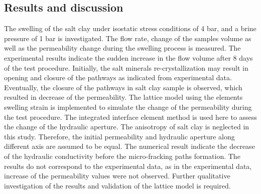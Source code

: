 
\subsection{Results and discussion}

The swelling of the salt clay under isostatic stress conditions of 4 bar, and a brine pressure of 1 bar is investigated. The flow rate, change of the samples volume as well as the permeability change during the swelling process is measured. The experimental results indicate the sudden increase in the flow volume after 8 days of the test procedure. Initially, the salt minerals re-crystallization may result in opening and closure of the pathways as indicated from experimental data. Eventually, the closure of the pathways in salt clay sample is observed, which resulted in decrease of the permeability. The lattice model using the elements swelling strain is implemented to simulate the change of the permeability during the test procedure. The integrated interface element method is used here to assess the change of the hydraulic aperture. The anisotropy of salt clay is neglected in this study. Therefore, the initial permeability and hydraulic aperture along different axis are assumed to be equal. The numerical result indicate the decrease of the hydraulic conductivity before the micro-fracking paths formation. The results do not correspond to the experimental data, as in the experimental data, increase of the permeability values were not observed. Further qualitative investigation of the results and validation of the lattice model is required. 